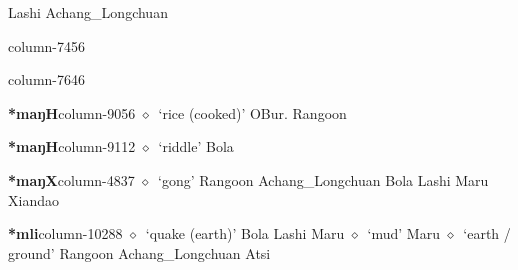 \hspace{1ex}
         Lashi 
\hspace{1ex}
         Achang\_Longchuan 
  \item {\footnotesize \textbf{}}{\tiny column-7456}
  \item {\footnotesize \textbf{}}{\tiny column-7646}
  \item {\footnotesize \textbf{*maŋH}}{\tiny column-9056}
         $\diamond$~`rice (cooked)'
         OBur. 
\hspace{1ex}
         Rangoon 
  \item {\footnotesize \textbf{*maŋH}}{\tiny column-9112}
         $\diamond$~`riddle'
         Bola 
  \item {\footnotesize \textbf{*maŋX}}{\tiny column-4837}
         $\diamond$~`gong'
         Rangoon 
\hspace{1ex}
         Achang\_Longchuan 
\hspace{1ex}
         Bola 
\hspace{1ex}
         Lashi 
\hspace{1ex}
         Maru 
\hspace{1ex}
         Xiandao 
  \item {\footnotesize \textbf{*mli}}{\tiny column-10288}
         $\diamond$~`quake (earth)'
         Bola 
\hspace{1ex}
         Lashi 
\hspace{1ex}
         Maru 
\hspace{1ex}
         $\diamond$~`mud'
         Maru 
\hspace{1ex}
         $\diamond$~`earth / ground'
         Rangoon 
\hspace{1ex}
         Achang\_Longchuan 
\hspace{1ex}
         Atsi 
\hspace{1ex}
